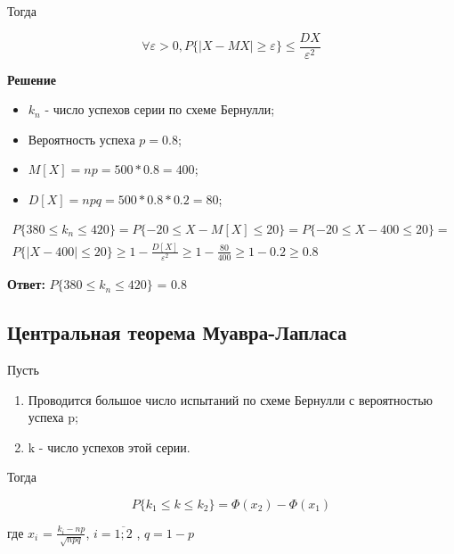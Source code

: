 \documentclass[12pt, a4paper]{report}
\begin{document}
	Тогда
	
	\begin{equation*}
	\forall \varepsilon > 0, P\{ |X - MX| \geq \varepsilon \} \le \frac{DX}{\varepsilon^2}
	\end{equation*}
	
	
	
	\textbf{Решение}
	
	\begin{itemize}
		\item $k_n$  - число успехов серии по схеме Бернулли;
		\item Вероятность успеха $p = 0.8$;
		\item $M[X] = np = 500 * 0.8 = 400$;
		\item $D[X] = npq = 500 * 0.8 * 0.2 = 80$;
	\end{itemize}


	\begin{multline*}
	P \{ 380 \le k_n \le 420 \} = P \{ -20 \le X - M[X] \le 20 \} = P \{ -20 \le X - 400 \le 20 \} = \\
    P \{ |X - 400| \le 20 \} \geq 1 - \frac{D[X]}{\varepsilon^2} \geq 1 - \frac{80}{400} \geq 1 - 0.2 \geq 0.8
	\end{multline*}
	
	\vspace{0.5cm}
	\textbf{Ответ:}
	$P \{ 380 \le k_n \le 420 \}$ = 0.8
	
	
	\vspace{0.5cm}\subsection{Центральная теорема Муавра-Лапласа}
	
	    Пусть
	
	\begin{enumerate}
		\item Проводится большое число испытаний по схеме Бернулли с вероятностью успеха p;
		\item k - число успехов этой серии.
	\end{enumerate}

	Тогда
	
	\begin{equation*}
	P\{ k_1 \le k \le k_2 \} = \Phi(x_2) - \Phi(x_1)
	\end{equation*}
	
	где $x_i$ = $\frac{k_i - np}{\sqrt{npq}}$, $i = \overline{1;2}$ , $q = 1 - p$
	
\end{document}

